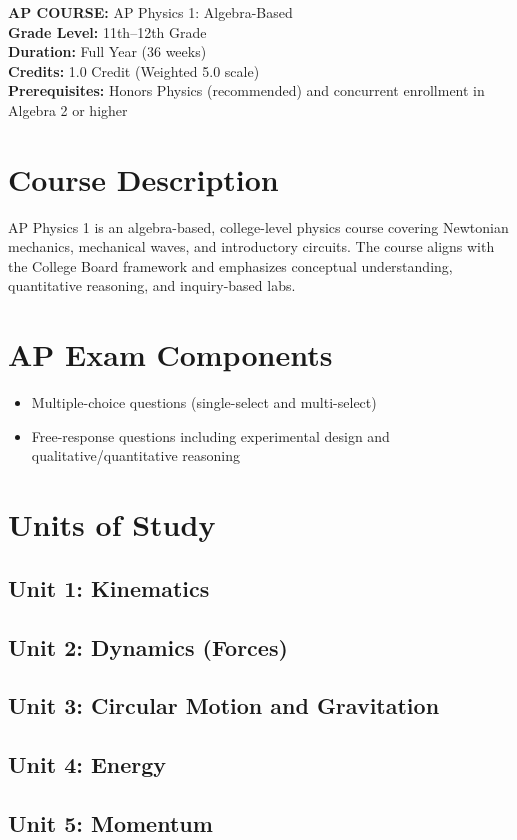 \documentclass[12pt,oneside]{book}
\begin{document}
\noindent\textbf{AP COURSE:} AP Physics 1: Algebra-Based\\
\textbf{Grade Level:} 11th--12th Grade\\
\textbf{Duration:} Full Year (36 weeks)\\
\textbf{Credits:} 1.0 Credit (Weighted 5.0 scale)\\
\textbf{Prerequisites:} Honors Physics (recommended) and concurrent enrollment in Algebra 2 or higher

\section{Course Description}
AP Physics 1 is an algebra-based, college-level physics course covering Newtonian mechanics,
mechanical waves, and introductory circuits. The course aligns with the College Board framework
and emphasizes conceptual understanding, quantitative reasoning, and inquiry-based labs.

\section{AP Exam Components}
\begin{itemize}[leftmargin=2em]
    \item Multiple-choice questions (single-select and multi-select)
    \item Free-response questions including experimental design and qualitative/quantitative reasoning
\end{itemize}

\section{Units of Study}
\subsection*{Unit 1: Kinematics}
\subsection*{Unit 2: Dynamics (Forces)}
\subsection*{Unit 3: Circular Motion and Gravitation}
\subsection*{Unit 4: Energy}
\subsection*{Unit 5: Momentum}
\end{document}
